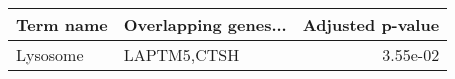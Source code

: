\begin{tabular}{llr}
\toprule
Term name & Overlapping genes... &  Adjusted p-value \\
\midrule
 Lysosome &          LAPTM5,CTSH &          3.55e-02 \\
\bottomrule
\end{tabular}
